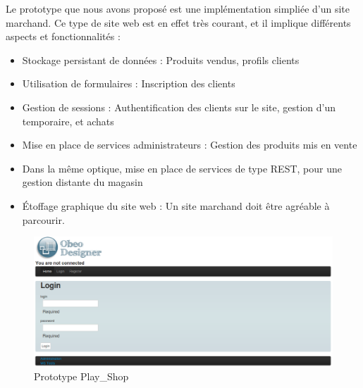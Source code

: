 Le prototype que nous avons proposé est une implémentation simpliée d'un site marchand. Ce type de site web est en effet très courant, et il implique différents aspects et fonctionnalités : 
\begin{itemize}
\item Stockage persistant de données : Produits vendus, profils clients
\item Utilisation de formulaires : Inscription des clients
\item Gestion de sessions : Authentification des clients sur le site, gestion d'un  temporaire, et achats
\item Mise en place de services administrateurs : Gestion des produits mis en vente
\item Dans la même optique, mise en place de services de type REST, pour une gestion distante du magasin
\item Étoffage graphique du site web : Un site marchand doit être agréable à parcourir.
\end{itemize}

\begin{figure}[htb]
  \centering
  \includegraphics[scale=.4]{img/proto.eps}
  \caption{Prototype Play\_Shop}
  \label{fig:pro}
\end{figure}





